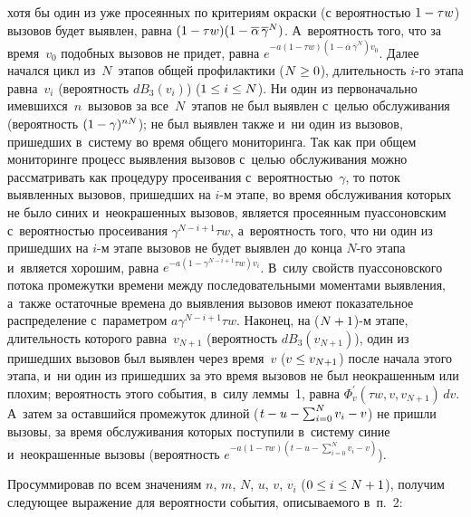 \begin{multicols}{2}
\begin{enumerate}
хотя бы один из уже просеянных по критериям окраски (с вероятностью $1\hm- 
\tau w$) вызовов будет выявлен, равна $(1\hm-\tau w) (1\hm- \overline{\alpha}\, 
\overline{\gamma}^N)$. А~вероятность того, что за время~$v_0$ подобных 
вызовов не придет, равна $e^{-a(1-\tau w)(1-
\overline{\alpha}\,\overline{\gamma}^N)v_0}$. Далее начался цикл из~$N$~этапов 
общей профилактики ($N\hm\geq0$), длительность $i$-го этапа равна~$v_i$ 
(вероятность $dB_3(v_i)$) ($1\hm\leq i\hm\leq N$). Ни один из первоначально 
имевшихся~$n$~вызовов за все~$N$~этапов не был выявлен с~целью 
обслуживания (вероятность $(1\hm- \gamma)^{nN}$); не был выявлен также 
и~ни один из вызовов, пришедших в~систему во время общего мониторинга. 
Так как при общем мониторинге процесс выявления вызовов с~\mbox{целью} 
обслуживания можно рассматривать как процедуру просеивания 
с~вероятностью~$\gamma$, то поток выявленных вызовов, пришедших на \mbox{$i$-м} 
этапе, во время обслуживания которых не было синих и~неокрашенных 
вызовов, является просеянным пуассоновским с~вероятностью просеивания 
$\gamma^{N-i+1} \tau w$, а~вероятность того, что ни один из пришедших на 
$i$-м этапе вызовов не будет выявлен до конца $N$-го этапа и~является 
хорошим, равна 
 $e^{-a(1-\gamma^{N-i+1}\tau w)v_i}$. В~силу свойств пуассоновского потока 
промежутки вре\-ме\-ни между последовательными моментами выявления, 
а~также остаточные времена до выявления вызовов имеют показательное 
распределение с~параметром $a\gamma^{N-i+1}\tau w$. Наконец, на 
($N\hm+1$)-м этапе, длительность которого равна~$v_{N+1}$ (вероятность 
$dB_3(v_{N+1})$), один из пришедших вызовов был выявлен через время~$v$ 
($v\hm\leq v_{N+1}$) после начала этого этапа, и~ни один из пришедших за это 
время вызовов не был неокрашенным или плохим; вероятность этого события, 
в~силу леммы~1, равна $\Phi^\prime_v(\tau w, v, v_{N+1})\,dv$. А~затем за 
оставшийся промежуток длиной ($t\hm-u\hm-\sum\nolimits^N_{i=0} v_i\hm- v$) 
не пришли вызовы, за время обслуживания которых поступили в~систему синие и~неокрашенные вызовы (вероятность $e^{-a(1-\tau w) (t -u-
\sum\nolimits^N_{i=0} v_i-v)}$).\\[-13pt]
\end{enumerate}
  
  Просуммировав по всем значениям $n$, $m$, $N$, $u$, ${v}$, $v_i$ 
($0\hm\leq i \hm \leq N\hm+1$), получим следующее выражение для вероятности 
события, описываемого в~п.~2:

\vspace*{-4pt}


\end{multicols}
